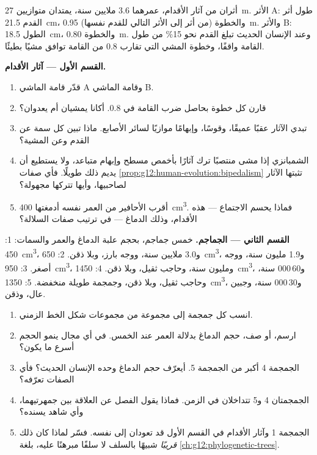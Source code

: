 \begin{problem}
\label{pb:g12:human-evolution:1}
أثران من آثار الأقدام، عمرهما 3.6 ملايين سنة، يمتدان متوازيين
\qty{27}{m}. الأثر A: طول أثر القدم \qty{21.5}{cm}، والخطوة (من أثر
إلى الأثر التالي للقدم نفسها) \qty{0.95}{m}. والأثر B: الطول
\qty{18.5}{cm}، والخطوة \qty{0.80}{m}. وعند الإنسان الحديث تبلغ القدم
نحو 15\% من طول القامة واقفًا، وخطوة المشي التي تقارب 0.8 من القامة
توافق مشيًا بطيئًا.

\medskip
\noindent\textbf{القسم الأول --- آثار الأقدام.}
\begin{enumerate}
  \item قدّر قامة الماشي A وقامة الماشي B.
  \item قارن كل خطوة بحاصل ضرب القامة في 0.8. أكانا يمشيان أم يعدوان؟
  \item تبدي الآثار عقبًا عميقًا، وقوسًا، وإبهامًا موازيًا لسائر
        الأصابع. ماذا تبين كل سمة عن القدم وعن المشية؟
  \item الشمبانزي إذا مشى منتصبًا ترك آثارًا بأخمص مسطح وإبهام متباعد،
        ولا يستطيع أن يديم ذلك طويلًا. فأي صفات
        \cref{prop:g12:human-evolution:bipedalism} تثبتها الآثار
        لصاحبيها، وأيها تتركها مجهولة؟
  \item أقرب الأحافير من العمر نفسه أدمغتها \qty{400}{cm^3}. فماذا
        يحسم الاجتماع --- هذه الأقدام، وذلك الدماغ --- في ترتيب صفات
        السلالة؟
\end{enumerate}

\medskip
\noindent\textbf{القسم الثاني --- الجماجم.}
خمس جماجم، بحجم علبة الدماغ والعمر والسمات:
1: \qty{450}{cm^3}، و3.0 ملايين سنة، ووجه بارز، وبلا ذقن.
2: \qty{650}{cm^3}، و1.9 مليون سنة، ووجه أصغر.
3: \qty{950}{cm^3}، ومليون سنة، وحاجب ثقيل، وبلا ذقن.
4: \qty{1450}{cm^3}، و60\,000 سنة، وحاجب ثقيل، وبلا ذقن، وجمجمة طويلة
منخفضة.
5: \qty{1350}{cm^3}، و30\,000 سنة، وجبين عال، وذقن.
\begin{enumerate}[resume]
  \item انسب كل جمجمة إلى مجموعة من مجموعات شكل الخط الزمني.
  \item ارسم، أو صف، حجم الدماغ بدلالة العمر عند الخمس. في أي مجال
        ينمو الحجم أسرع ما يكون؟
  \item الجمجمة 4 أكبر من الجمجمة 5. أيعرّف حجم الدماغ وحده الإنسان
        الحديث؟ فأي الصفات تعرّفه؟
  \item الجمجمتان 4 و5 تتداخلان في الزمن. فماذا يقول الفصل عن العلاقة
        بين جمهرتيهما، وأي شاهد يسنده؟
  \item الجمجمة 1 وآثار الأقدام في القسم الأول قد تعودان إلى 
        نفسه. فسّر لماذا كان ذلك  \emph{قريبًا} شبيهًا بالسلف لا
        سلفًا مبرهنًا عليه، بلغة \cref{ch:g12:phylogenetic-trees}.
\end{enumerate}


\end{problem}
